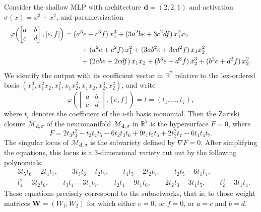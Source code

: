 \documentclass{article} %
\theoremstyle{plain}%
\theoremstyle{definition}
\theoremstyle{remark}
\begin{document}
Consider the shallow MLP with architecture $\mathbf{d} = (2,2,1)$ and activation
$\sigma(x) = x^3 + x^2$, and parametrization
\begin{equation}
\begin{aligned}
\varphi\Bigl(\begin{bmatrix} a & b \\ c & d \end{bmatrix}, [e,f]\Bigr)
={}& (a^3 e + c^3 f)\,x_1^3
     + (3 a^2 b e + 3 c^2 d f)\,x_1^2 x_2
\\
&\quad
   + (a^2 e + c^2 f)\,x_1^2
   + (3 a b^2 e + 3 c d^2 f)\,x_1 x_2^2
\\
&\quad
   + (2 a b e + 2 c d f)\,x_1 x_2
   + (b^3 e + d^3 f)\,x_2^3
   + (b^2 e + d^2 f)\,x_2^2 .
\end{aligned}
\end{equation}
We identify the output with its coefficient vector in $\mathbb{R}^7$
relative to the lex-ordered basis
$(x_1^3, x_1^2 x_2, x_1^2, x_1 x_2^2, x_1 x_2, x_2^3, x_2^2)$, and write
\begin{equation}
\varphi\!\left(\begin{bmatrix} a & b \\ c & d \end{bmatrix}, [e,f]\right)=t
= (t_1,\dots,t_7),
\end{equation}
where \(t_i\) denotes the coefficient of the \(i\)-th basis monomial. Then the Zariski closure $\overline{\mathcal{M}}_{\mathbf{d},\sigma}$ of the neuromanifold ${\mathcal{M}}_{\mathbf{d},\sigma}$ in $\mathbb{R}^7$ is the hypersurface $F=0$, where
\begin{equation}
F=2 t_3 t_4^2 - t_2 t_4 t_5 - 6 t_2 t_3 t_6 + 9 t_1 t_5 t_6 + 2 t_2^2 t_7 - 6 t_1 t_4 t_7 .
\end{equation}
The singular locus of $\overline{\mathcal{M}}_{\mathbf{d},\sigma}$ is the subvariety defined by $\nabla F = 0$. After simplifying the equations, this locus is a $3$-dimensional variety cut out by the following polynomials:
\begin{equation}
\begin{aligned}
&3 t_{5} t_{6} - 2 t_{4} t_{7},\qquad
3 t_{3} t_{6} - t_{2} t_{7},\qquad
t_{4} t_{5} - 2 t_{2} t_{7},\qquad
t_{2} t_{5} - 6 t_{1} t_{7},\\[2mm]
&t_{4}^{2} - 3 t_{2} t_{6},\qquad
t_{3} t_{4} - 3 t_{1} t_{7},\qquad
t_{2} t_{4} - 9 t_{1} t_{6},\qquad
2 t_{2} t_{3} - 3 t_{1} t_{5},\qquad
t_{2}^{2} - 3 t_{1} t_{4}.
\end{aligned}
\end{equation}
These equations precisely correspond to the subnetworks, that is, to those weight matrices $\mathbf{W} = (W_1,W_2)$ for which either $e=0$, or $f=0$, or $a=c$ and $b=d$.
\end{document}
